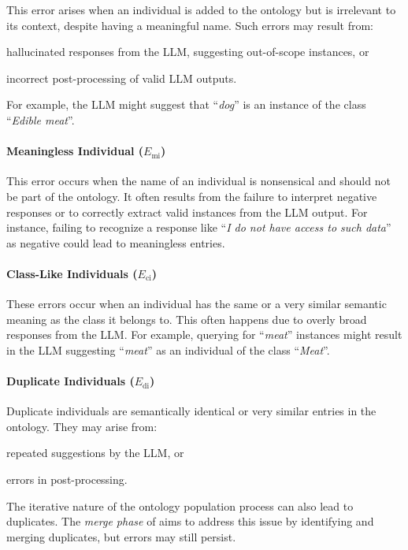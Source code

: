 This error arises when an individual is added to the ontology but is irrelevant to its context, despite having a meaningful name.
%
Such errors may result from:
%
\begin{inlinelist}
    \item hallucinated responses from the \gls{LLM}, suggesting out-of-scope instances, or
    \item incorrect post-processing of valid \gls{LLM} outputs.
\end{inlinelist}
%
For example, the \gls{LLM} might suggest that ``\emph{dog}'' is an instance of the class ``\emph{Edible meat}''.

%
\paragraph{Meaningless Individual (\(E_{\text{mi}}\))}

This error occurs when the name of an individual is nonsensical and should not be part of the ontology.
%
It often results from the failure to interpret negative responses or to correctly extract valid instances from the \gls{LLM} output.
%
For instance, failing to recognize a response like ``\emph{I do not have access to such data}'' as negative could lead to meaningless entries.

%
\paragraph{Class-Like Individuals (\(E_{\text{ci}}\))}

These errors occur when an individual has the same or a very similar semantic meaning as the class it belongs to.
%
This often happens due to overly broad responses from the \gls{LLM}.
%
For example, querying for ``\emph{meat}'' instances might result in the \gls{LLM} suggesting ``\emph{meat}'' as an individual of the class ``\emph{Meat}''.

%
\paragraph{Duplicate Individuals (\(E_{\text{di}}\))}

Duplicate individuals are semantically identical or very similar entries in the ontology.
%
They may arise from:
%
\begin{inlinelist}
    \item repeated suggestions by the \gls{LLM}, or
    \item errors in post-processing.
\end{inlinelist}
%
The iterative nature of the ontology population process can also lead to duplicates.
%
The \emph{merge phase} of \llmfkg{} aims to address this issue by identifying and merging duplicates, but errors may still persist.

